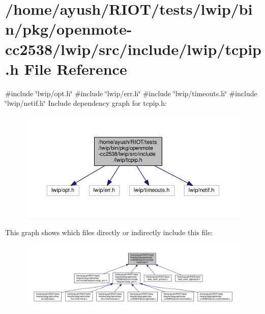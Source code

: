 \hypertarget{openmote-cc2538_2lwip_2src_2include_2lwip_2tcpip_8h}{}\section{/home/ayush/\+R\+I\+O\+T/tests/lwip/bin/pkg/openmote-\/cc2538/lwip/src/include/lwip/tcpip.h File Reference}
\label{openmote-cc2538_2lwip_2src_2include_2lwip_2tcpip_8h}
{\ttfamily \#include \char`\"{}lwip/opt.\+h\char`\"{}}\newline
{\ttfamily \#include \char`\"{}lwip/err.\+h\char`\"{}}\newline
{\ttfamily \#include \char`\"{}lwip/timeouts.\+h\char`\"{}}\newline
{\ttfamily \#include \char`\"{}lwip/netif.\+h\char`\"{}}\newline
Include dependency graph for tcpip.\+h\+:
\nopagebreak
\begin{figure}[H]
\begin{center}
\leavevmode
\includegraphics[width=350pt]{openmote-cc2538_2lwip_2src_2include_2lwip_2tcpip_8h__incl}
\end{center}
\end{figure}
This graph shows which files directly or indirectly include this file\+:
\nopagebreak
\begin{figure}[H]
\begin{center}
\leavevmode
\includegraphics[width=350pt]{openmote-cc2538_2lwip_2src_2include_2lwip_2tcpip_8h__dep__incl}
\end{center}
\end{figure}
